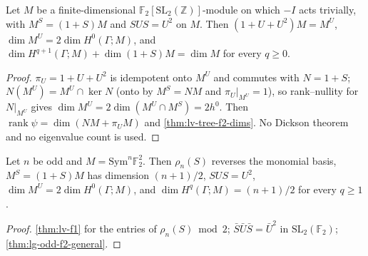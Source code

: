 \begin{theorem}[Characteristic $2$: $c_U=2h^0$ and $\dim H^{q+1}$ from $\dim(1+S)M$]\label{thm:lg-odd-f2-general}
  \leanok
  Let $M$ be a finite-dimensional $\mathbb F_2[\mathrm{SL}_2(\mathbb Z)]$-module on which $-I$ acts trivially, with
  $M^S=(1+S)M$ and $SUS=U^2$ on $M$.  Then $(1+U+U^2)M=M^U$, $\dim M^U=2\dim H^0(\Gamma;M)$, and
  $\dim H^{q+1}(\Gamma;M)+\dim(1+S)M=\dim M$ for every $q\ge0$.
\end{theorem}
\begin{proof}
  \leanok
  $\pi_U=1+U+U^2$ is idempotent onto $M^U$ and commutes with $N=1+S$; $N(M^U)=M^U\cap\ker N$ (onto by $M^S=NM$ and $\pi_U|_{M^U}=1$), so
  rank--nullity for $N|_{M^U}$ gives $\dim M^U=2\dim(M^U\cap M^S)=2h^0$.  Then $\operatorname{rank}\psi=\dim(NM+\pi_UM)$ and
  \ref{thm:lv-tree-f2-dims}.  No Dickson theorem and no eigenvalue count is used.
\end{proof}

\begin{theorem}[Odd $n$: $\dim_{\mathbb F_2}H^q(\Gamma;\mathrm{Sym}^n\mathbb F_2^2)=(n+1)/2$ for every $q\ge1$]\label{thm:lg-odd-f2-dims}
  \leanok
  Let $n$ be odd and $M=\mathrm{Sym}^n\mathbb F_2^2$.  Then $\rho_n(S)$ reverses the monomial basis, $M^S=(1+S)M$ has dimension $(n+1)/2$,
  $SUS=U^2$, $\dim M^U=2\dim H^0(\Gamma;M)$, and $\dim H^{q}(\Gamma;M)=(n+1)/2$ for every $q\ge1$.
\end{theorem}
\begin{proof}
  \leanok
  \ref{thm:lv-f1} for the entries of $\rho_n(S)\bmod2$; $\bar S\bar U\bar S=\bar U^2$ in $\mathrm{SL}_2(\mathbb F_2)$; \ref{thm:lg-odd-f2-general}.
\end{proof}

